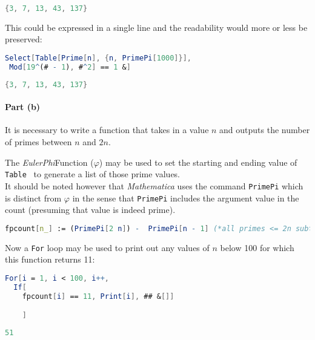 \documentclass[12pt]{article}
\begin{document}
\begin{lstlisting}[language = Mathematica]
{3, 7, 13, 43, 137}
\end{lstlisting}	


This could be expressed in a single line and the readability would more or less be preserved:

\begin{lstlisting}[language = Mathematica]
Select[Table[Prime[n], {n, PrimePi[1000]}], 
 Mod[19^(# - 1), #^2] == 1 &]
\end{lstlisting}	

\begin{lstlisting}[language = Mathematica]
{3, 7, 13, 43, 137}
\end{lstlisting}	

\paragraph{Part (b)}

It is necessary to write a function that takes in a value $n$ and outputs the number of primes between $n$ and $2n$.

The \textit{Euler\-Phi}Function ($\varphi$) may be used to set the starting and ending value of \verb| Table | to generate a list of those prime values.\\

It should be noted however that \textit{Mathematica} uses the command \verb|PrimePi| which is distinct from $\varphi$ in the sense that \verb|PrimePi| includes the argument value in the count (presuming that value is indeed prime).

\begin{lstlisting}[language = Mathematica]
fpcount[n_] := (PrimePi[2 n]) -  PrimePi[n - 1] (*all primes <= 2n subtract any primes <   n (but not including n, beware off-by-one-bug*)
\end{lstlisting}	

Now a \verb|For|  loop may be used to print out any values of $n$ below 100 for which this function returns 11:

\begin{lstlisting}[language = Mathematica]
For[i = 1, i < 100, i++, 
  If[
  	fpcount[i] == 11, Print[i], ## &[]]

    ]
 \end{lstlisting}	

 \begin{lstlisting}[language = Mathematica]
 51
 \end{lstlisting}	
\end{document}
